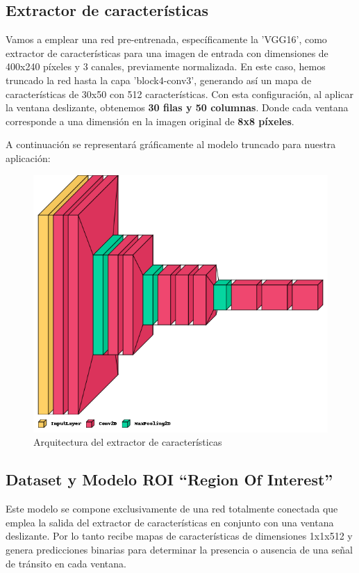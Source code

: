     \subsection{Extractor de características}
    Vamos a emplear una red pre-entrenada, específicamente la 'VGG16', como extractor de características para una imagen de entrada con dimensiones de 400x240 píxeles y 3 canales, previamente normalizada. En este caso, hemos truncado la red hasta la capa 'block4-conv3', generando así un mapa de características de 30x50 con 512 características. Con esta configuración, al aplicar la ventana deslizante, obtenemos \textbf{30 filas y 50 columnas}. Donde cada ventana corresponde a una dimensión en la imagen original de \textbf{8x8 píxeles}.

    A continuación se representará gráficamente al modelo truncado para nuestra aplicación:

    \vspace{0.4cm}
    
    \begin{figure}[ht]
	    \centering
		\includegraphics[scale=0.4]{img/VGG16.png}
		\caption{Arquitectura del extractor de características}
	\end{figure}

    \subsection{Dataset y Modelo ROI ``Region Of Interest''}
    Este modelo se compone exclusivamente de una red totalmente conectada que emplea la salida del extractor de características en conjunto con una ventana deslizante. Por lo tanto recibe mapas de características de dimensiones 1x1x512 y genera predicciones binarias para determinar la presencia o ausencia de una señal de tránsito en cada ventana.

